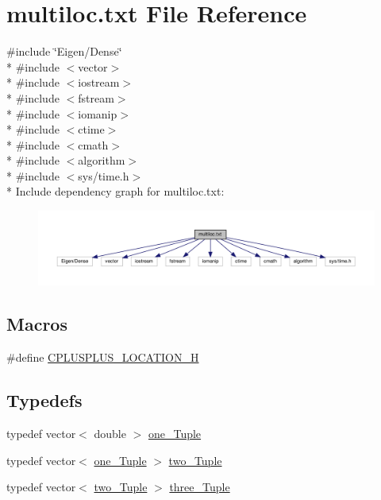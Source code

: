 \hypertarget{multiloc_8txt}{}\section{multiloc.\+txt File Reference}
\label{multiloc_8txt}
{\ttfamily \#include \char`\"{}Eigen/\+Dense\char`\"{}}\\*
{\ttfamily \#include $<$vector$>$}\\*
{\ttfamily \#include $<$iostream$>$}\\*
{\ttfamily \#include $<$fstream$>$}\\*
{\ttfamily \#include $<$iomanip$>$}\\*
{\ttfamily \#include $<$ctime$>$}\\*
{\ttfamily \#include $<$cmath$>$}\\*
{\ttfamily \#include $<$algorithm$>$}\\*
{\ttfamily \#include $<$sys/time.\+h$>$}\\*
Include dependency graph for multiloc.\+txt\+:
\nopagebreak
\begin{figure}[H]
\begin{center}
\leavevmode
\includegraphics[width=350pt]{multiloc_8txt__incl}
\end{center}
\end{figure}
\subsection*{Macros}
\begin{DoxyCompactItemize}
\item 
\#define \hyperlink{multiloc_8txt_a2649b6521b79d3d51d2237b5dae28e7e}{C\+P\+L\+U\+S\+P\+L\+U\+S\+\_\+\+L\+O\+C\+A\+T\+I\+O\+N\+\_\+H}
\end{DoxyCompactItemize}
\subsection*{Typedefs}
\begin{DoxyCompactItemize}
\item 
typedef vector$<$ double $>$ \hyperlink{multiloc_8txt_a490e31016ad1c0d99b23e323d64e3aac}{one\+\_\+\+Tuple}
\item 
typedef vector$<$ \hyperlink{multiloc_8txt_a490e31016ad1c0d99b23e323d64e3aac}{one\+\_\+\+Tuple} $>$ \hyperlink{multiloc_8txt_a2e41d128befae015727cbf20484696a9}{two\+\_\+\+Tuple}
\item 
typedef vector$<$ \hyperlink{multiloc_8txt_a2e41d128befae015727cbf20484696a9}{two\+\_\+\+Tuple} $>$ \hyperlink{multiloc_8txt_aa614d5a3aa93583e717bf9a9c9b6627b}{three\+\_\+\+Tuple}
\end{DoxyCompactItemize}
